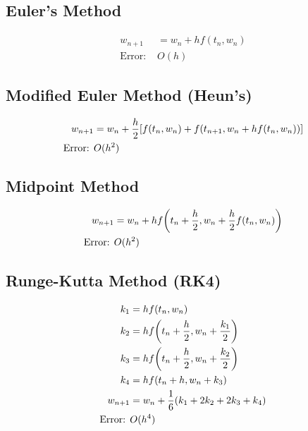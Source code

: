 \documentclass[9pt, letterpaper]{extarticle}
\begin{document}
\begin{multicols*}{3}
  \subsection{Euler's Method}
  \begin{align*}
    w_{n+1} &= w_n + h f(t_n, w_n) \\
    \text{Error: } & O(h)
  \end{align*}

  \subsection{Modified Euler Method (Heun's)}
  \begin{align*}
    w_{n+1} &= w_n + \frac{h}{2} \qty[f(t_n, w_n) + f(t_{n+1}, w_n + h f(t_n, w_n))] \\
    \text{Error: } & O(h^2)
  \end{align*}

  \subsection{Midpoint Method}
  \begin{align*}
    w_{n+1} &= w_n + h f\qty(t_n + \frac{h}{2}, w_n + \frac{h}{2} f(t_n, w_n)) \\
    \text{Error: } & O(h^2)
  \end{align*}

  \subsection{Runge-Kutta Method (RK4)}
  \begin{align*}
    k_1 &= h f(t_n, w_n) \\
    k_2 &= h f\qty(t_n + \frac{h}{2}, w_n + \frac{k_1}{2}) \\
    k_3 &= h f\qty(t_n + \frac{h}{2}, w_n + \frac{k_2}{2}) \\
    k_4 &= h f(t_n + h, w_n + k_3) \\
    w_{n+1} &= w_n + \frac{1}{6}(k_1 + 2k_2 + 2k_3 + k_4) \\
    \text{Error: } & O(h^4)
  \end{align*}
\end{multicols*}
\end{document}
